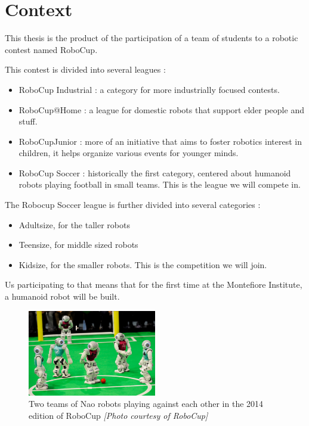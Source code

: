 \section{Context}
This thesis is the product of the participation of a team of students to a robotic contest named RoboCup.

This contest is divided into several leagues :
\begin{itemize}
\item RoboCup Industrial : a category for more industrially focused contests.
\item RoboCup@Home : a league for domestic robots that support elder people and stuff.
\item RoboCupJunior : more of an initiative that aims to foster robotics interest in children, it helps organize various events for younger minds.
\item RoboCup Soccer : historically the first category, centered about humanoid robots playing football in small teams. This is the league we will compete in.
\end{itemize}
The Robocup Soccer league is further divided into several categories :\begin{itemize}
\item Adultsize, for the taller robots
\item Teensize, for middle sized robots
\item Kidsize, for the smaller robots. This is the competition we will join.
\end{itemize}

Us participating to that means that for the first time at the Montefiore Institute, a humanoid robot will be built.

\begin{figure}[htp]
\center
\includegraphics[width=0.5\textwidth]{figures/robocup}
\caption[Two teams of Nao robots playing against each other]{Two teams of Nao robots playing against each other in the 2014 edition of RoboCup \textit{[Photo courtesy of RoboCup]}}
\label{fig:intro_robocup}
\end{figure}

